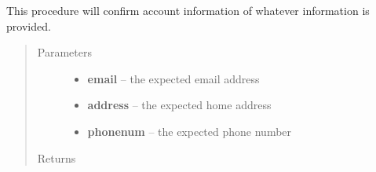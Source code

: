 \documentclass[letterpaper,10pt,english]{sphinxmanual}
\begin{document}
\begin{fulllineitems}
\begin{fulllineitems}
\label{STD/WebUI:WebUI.WebUI.WebUI.confirm_account_info}
This procedure will confirm account information of whatever information is provided.
\begin{quote}\begin{description}
\item[{Parameters}] \leavevmode\begin{itemize}
\item {} 
\textbf{email} -- the expected email address

\item {} 
\textbf{address} -- the expected home address

\item {} 
\textbf{phonenum} -- the expected phone number

\end{itemize}

\item[{Returns}] \leavevmode


\end{description}\end{quote}

\end{fulllineitems}


\begin{fulllineitems}
\label{STD/WebUI:WebUI.WebUI.WebUI.create_admin}
\end{fulllineitems}


\begin{fulllineitems}
\label{STD/WebUI:WebUI.WebUI.WebUI.create_experiment}
\end{fulllineitems}



\end{fulllineitems}
\end{document}
